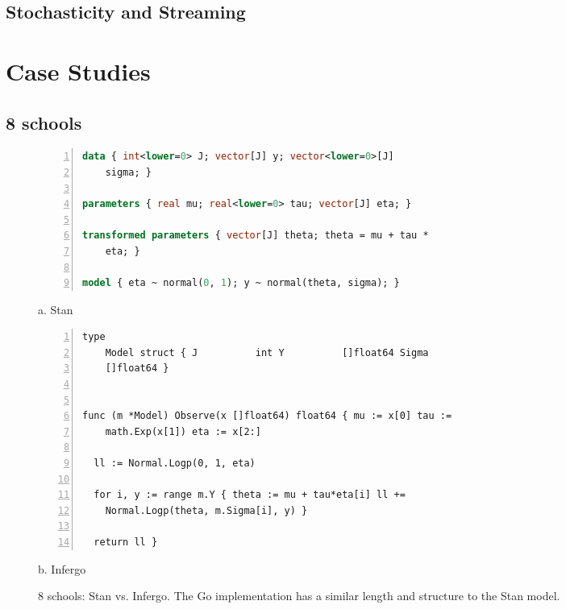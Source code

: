 \documentclass[sigplan,review,10pt,anonymous]{acmart}
\begin{document}
\begin{sloppypar}

\subsection{Stochasticity and Streaming}

\section{Case Studies} \label{sec:case-studies}

\subsection{8 schools}

\begin{figure*} \begin{minipage}{0.45\textwidth}
	\begin{lstlisting}[language=Stan,framexleftmargin=10pt,numbers=left]
	data { int<lower=0> J; vector[J] y; vector<lower=0>[J]
	sigma; }

parameters { real mu; real<lower=0> tau; vector[J] eta; }

transformed parameters { vector[J] theta; theta = mu + tau *
	eta; }

model { eta ~ normal(0, 1); y ~ normal(theta, sigma); }
	\end{lstlisting}

\centering a. Stan \end{minipage} \hfill
\begin{minipage}{0.45\textwidth}
	\begin{lstlisting}[framexleftmargin=10pt,numbers=left] type
	Model struct { J          int Y          []float64 Sigma
	[]float64 }


func (m *Model) Observe(x []float64) float64 { mu := x[0] tau :=
	math.Exp(x[1]) eta := x[2:]

  ll := Normal.Logp(0, 1, eta)

  for i, y := range m.Y { theta := mu + tau*eta[i] ll +=
	Normal.Logp(theta, m.Sigma[i], y) }

  return ll } \end{lstlisting} \centering b. Infergo
\end{minipage} \caption{8 schools: Stan vs. Infergo. The Go
implementation has a similar length and structure to the Stan
model.} \label{fig:8-schools} \end{figure*}


\end{sloppypar}
\end{document}
